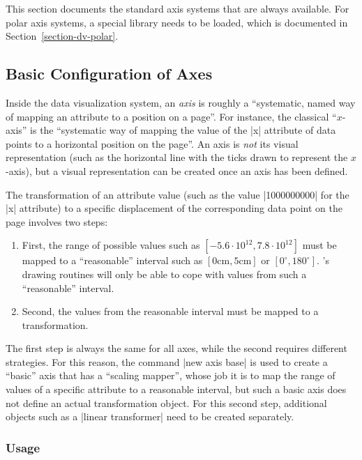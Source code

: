 This section documents the standard axis systems that are always available. For
polar axis systems, a special library needs to be loaded, which is documented
in Section~\ref{section-dv-polar}.


\subsection{Basic Configuration of Axes}
\label{section-dv-axes-main}

Inside the data visualization system, an \emph{axis} is roughly a ``systematic,
named way of mapping an attribute to a position on a page''. For instance, the
classical ``$x$-axis'' is the ``systematic way of mapping the value of the |x|
attribute of data points to a horizontal position on the page''. An axis is
\emph{not} its visual representation (such as the horizontal line with the
ticks drawn to represent the $x$-axis), but a visual representation can be
created once an axis has been defined.

The transformation of an attribute value (such as the value |1000000000| for
the |x| attribute) to a specific displacement of the corresponding data point
on the page involves two steps:
%
\begin{enumerate}
    \item First, the range of possible values such as $[-5.6\cdot
        10^{12},7.8\cdot 10^{12}]$ must be mapped to a ``reasonable'' interval
        such as $[0\mathrm{cm},5\mathrm{cm}]$ or $[0^\circ,180^\circ]$.
        \tikzname's drawing routines will only be able to cope with values from
        such a ``reasonable'' interval.
    \item Second, the values from the reasonable interval must be mapped to a
        transformation.
\end{enumerate}
%
The first step is always the same for all axes, while the second requires
different strategies. For this reason, the command |new axis base| is used to
create a ``basic'' axis that has a ``scaling mapper'', whose job it is to map
the range of values of a specific attribute to a reasonable interval, but such
a basic axis does not define an actual transformation object. For this second
step, additional objects such as a |linear transformer| need to be created
separately.


\subsubsection{Usage}

